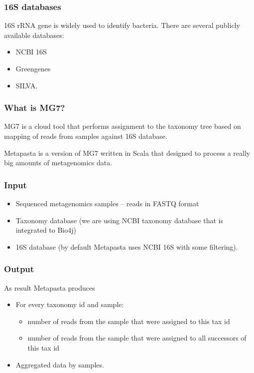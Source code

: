 \documentclass{beamer}
\begin{document}
\begin{frame}
\frametitle{16S databases}
16S rRNA gene is widely used to identify bacteria. There are several publicly available databases:

\begin{itemize}
  \item NCBI 16S
  \item Greengenes
  \item SILVA.
\end{itemize}


\end{frame}

\begin{frame}
\frametitle{What is MG7?}

MG7 is a cloud tool that performs assignment to the taxonomy tree based on mapping of reads from samples
against 16S database.

\vspace{1em}


Metapasta is a version of MG7 written in Scala that designed to process a really big amounts of metagenomics data.


\end{frame}

\begin{frame}
\frametitle{Input}
\begin{itemize}
  \item Sequenced metagenomics samples -- reads in FASTQ format
  \item Taxonomy database (we are using NCBI taxonomy database that is integrated to Bio4j)
  \item 16S database (by default Metapasta uses NCBI 16S with some filtering).
\end{itemize}
\end{frame}


\begin{frame}
\frametitle{Output}
As result Metapasta produces
\begin{itemize}
  \item For every taxonomy id and sample: 
  \begin{itemize}
  	\item number of reads from the sample that were assigned to this tax id
  	\item number of reads from the sample that were assigned to all successors of this tax id
  \end{itemize} 
  \item Aggregated data by samples. 
\end{itemize}
\end{frame}
\end{document}
